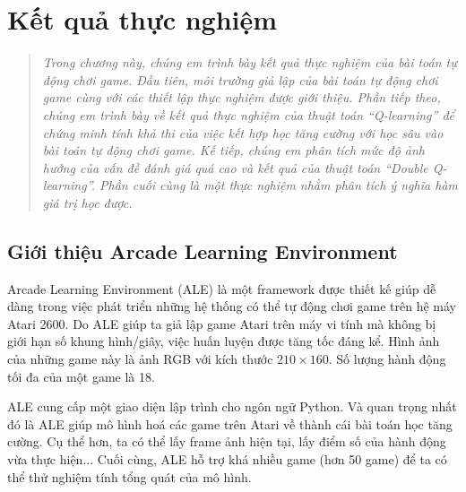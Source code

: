 \chapter{Kết quả thực nghiệm}
\ifpdf
\graphicspath{{Chapter4/Chapter4Figs/PNG/}{Chapter4/Chapter4Figs/PDF/}{Chapter4/Chapter4Figs/}}
\else
\graphicspath{{Chapter4/Chapter4Figs/EPS/}{Chapter4/Chapter4Figs/}}
\fi
\begin{quote}
	\textit{Trong chương này, chúng em trình bày kết quả thực nghiệm của bài toán tự động chơi game.
	Đầu tiên, môi trường giả lập của bài toán tự động chơi game cùng với các thiết lập thực nghiệm được giới thiệu.
	Phần tiếp theo, chúng em trình bày về kết quả thực nghiệm của thuật toán ``Q-learning'' để chứng minh tính khả thi của việc kết hợp học tăng cường với học sâu vào bài toán tự động chơi game.
	Kế tiếp, chúng em phân tích mức độ ảnh hưởng của vấn đề đánh giá quá cao và kết quả của thuật toán ``Double Q-learning''.
	Phần cuối cùng là một thực nghiệm nhằm phân tích ý nghĩa hàm giá trị học được.}
\end{quote}
 
\section{Giới thiệu Arcade Learning Environment}
Arcade Learning Environment (ALE) \cite{bellemare2012arcade} là một framework được thiết kế giúp dễ dàng trong việc phát triển những hệ thống có thể tự động chơi game trên hệ máy Atari 2600.
Do ALE giúp ta giả lập game Atari trên máy vi tính mà không bị giới hạn số khung hình/giây, việc huấn luyện được tăng tốc đáng kể.
Hình ảnh của những game này là ảnh RGB với kích thước $210 \times 160$. 
Số lượng hành động tối đa của một game là 18.

ALE cung cấp một giao diện lập trình cho ngôn ngữ Python.
Và quan trọng nhất đó là ALE giúp mô hình hoá các game trên Atari về thành cái bài toán học tăng cường.
Cụ thể hơn, ta có thể lấy frame ảnh hiện tại, lấy điểm số của hành động vừa thực hiện...
Cuối cùng, ALE hỗ trợ khá nhiều game (hơn 50 game) để ta có thể thử nghiệm tính tổng quát của mô hình.

